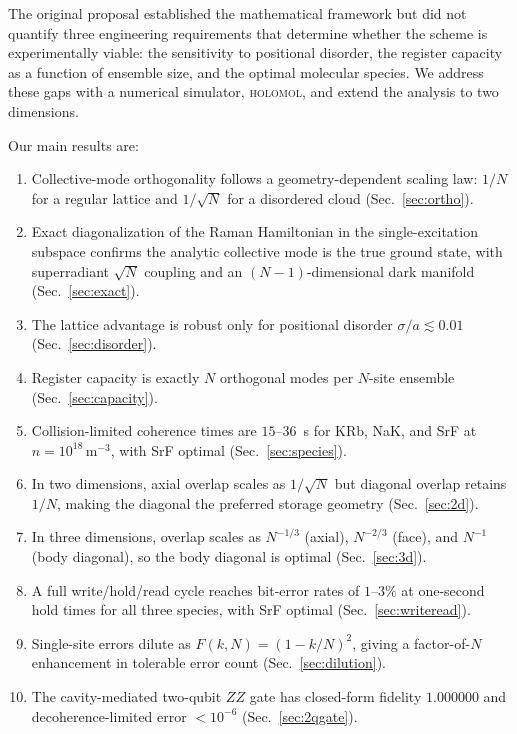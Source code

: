 \documentclass[11pt]{article}
\begin{document}
The original proposal established the mathematical framework but did not
quantify three engineering requirements that determine whether the scheme
is experimentally viable: the sensitivity to positional disorder, the
register capacity as a function of ensemble size, and the optimal
molecular species. We address these gaps with a numerical simulator,
\textsc{holomol}, and extend the analysis to two dimensions.

Our main results are:
\begin{enumerate}
  \item Collective-mode orthogonality follows a geometry-dependent
  scaling law: $1/N$ for a regular lattice and $1/\sqrt N$ for a
  disordered cloud (Sec.~\ref{sec:ortho}).
  \item Exact diagonalization of the Raman Hamiltonian in the
  single-excitation subspace confirms the analytic collective mode is
  the true ground state, with superradiant $\sqrt N$ coupling and an
  $(N-1)$-dimensional dark manifold (Sec.~\ref{sec:exact}).
  \item The lattice advantage is robust only for positional disorder
  $\sigma/a \lesssim 0.01$ (Sec.~\ref{sec:disorder}).
  \item Register capacity is exactly $N$ orthogonal modes per
  $N$-site ensemble (Sec.~\ref{sec:capacity}).
  \item Collision-limited coherence times are $15$--$36$~s for KRb, NaK,
  and SrF at $n = 10^{18}\,\mathrm{m}^{-3}$, with SrF optimal
  (Sec.~\ref{sec:species}).
  \item In two dimensions, axial overlap scales as $1/\sqrt N$ but
  diagonal overlap retains $1/N$, making the diagonal the preferred
  storage geometry (Sec.~\ref{sec:2d}).
  \item In three dimensions, overlap scales as $N^{-1/3}$ (axial),
  $N^{-2/3}$ (face), and $N^{-1}$ (body diagonal), so the body
  diagonal is optimal (Sec.~\ref{sec:3d}).
  \item A full write/hold/read cycle reaches bit-error rates of
  $1$--$3\%$ at one-second hold times for all three species, with SrF
  optimal (Sec.~\ref{sec:writeread}).
  \item Single-site errors dilute as $F(k,N) = (1-k/N)^2$, giving
  a factor-of-$N$ enhancement in tolerable error count
  (Sec.~\ref{sec:dilution}).
  \item The cavity-mediated two-qubit $ZZ$ gate has closed-form
  fidelity $1.000000$ and decoherence-limited error $<10^{-6}$
  (Sec.~\ref{sec:2qgate}).
\end{enumerate}
\end{document}
